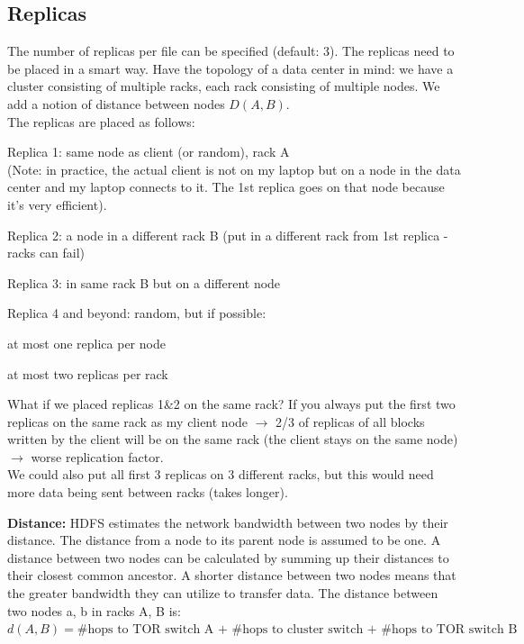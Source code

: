 \documentclass[11pt,oneside,a4paper]{article}
\begin{document}
\newpage

\subsection{Replicas}

The number of replicas per file can be specified (default: 3). The replicas need to be placed in a smart way. Have the topology of a data center in mind: we have a cluster consisting of multiple racks, each rack consisting of multiple nodes. We add a notion of distance between nodes $D(A,B)$.\\
The replicas are placed as follows:

\begin{compactitem}
	\item Replica 1: same node as client (or random), rack A\\
	(Note: in practice, the actual client is not on my laptop but on a node in the data center and my laptop connects to it. The 1st replica goes on that node because it's very efficient).
	\item Replica 2: a node in a different rack B (put in a different rack from 1st replica - racks can fail)
	\item Replica 3: in same rack B but on a different node
	\item Replica 4 and beyond: random, but if possible:
	\begin{compactitem}
		\item at most one replica per node
		\item at most two replicas per rack\\
	\end{compactitem}
\end{compactitem}

What if we placed replicas 1\&2 on the same rack? If you always put the first two replicas on the same rack as my client node $\rightarrow$ 2/3 of replicas of all blocks written by the client will be on the same rack (the client stays on the same node) $\rightarrow$ worse replication factor.\\

We could also put all first 3 replicas on 3 different racks, but this would need more data being sent between racks (takes longer).

\textbf{Distance:} HDFS estimates the network bandwidth between two nodes by their distance. The distance from a node to its parent node is assumed to be one. A distance between two nodes can be calculated by summing up their distances to their closest common ancestor. A shorter distance between two nodes means that the greater bandwidth they can utilize to transfer data. The distance between two nodes a, b in racks A, B is:\\
$d(A,B) = \text{\#hops to TOR switch A + \#hops to cluster switch + \#hops to TOR switch B + \#hops to node b}$\\
\end{document}
